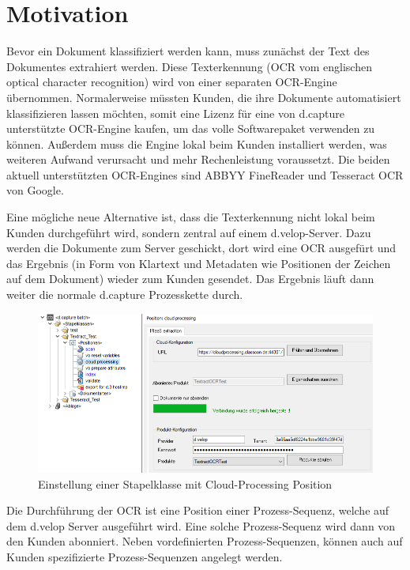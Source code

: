 \documentclass{whswinvcbook}
\begin{document}
\section{Motivation}
Bevor ein Dokument klassifiziert werden kann, muss zunächst der Text des Dokumentes extrahiert werden. Diese Texterkennung (OCR vom englischen optical character recognition) wird von einer separaten OCR-Engine übernommen. Normalerweise müssten Kunden, die ihre Dokumente automatisiert klassifizieren lassen möchten, somit eine Lizenz für eine von d.capture unterstützte OCR-Engine kaufen, um das volle Softwarepaket verwenden zu können. Außerdem muss die Engine lokal beim Kunden installiert werden, was weiteren Aufwand verursacht und mehr Rechenleistung voraussetzt. Die beiden aktuell unterstützten OCR-Engines sind ABBYY FineReader und Tesseract OCR von Google.

Eine mögliche neue Alternative ist, dass die Texterkennung nicht lokal beim Kunden durchgeführt wird, sondern zentral auf einem d.velop-Server. Dazu werden die Dokumente zum Server geschickt, dort wird eine OCR ausgefürt und das Ergebnis (in Form von Klartext und Metadaten wie Positionen der Zeichen auf dem Dokument) wieder zum Kunden gesendet. Das Ergebnis läuft dann weiter die normale d.capture Prozesskette durch.
\begin{figure}[h]
    \centering
    \includegraphics[width=1.1\textwidth]{img/textract_cloudprocessing.png}
    \caption{Einstellung einer Stapelklasse mit Cloud-Processing Position}
    \label{fig-textract-cloudprocessing}
\end{figure}


Die Durchführung der OCR ist eine Position einer Prozess-Sequenz, welche auf dem d.velop Server ausgeführt wird. Eine solche Prozess-Sequenz wird dann von den Kunden abonniert. Neben vordefinierten Prozess-Sequenzen, können auch auf Kunden spezifizierte Prozess-Sequenzen angelegt werden.
\end{document}
